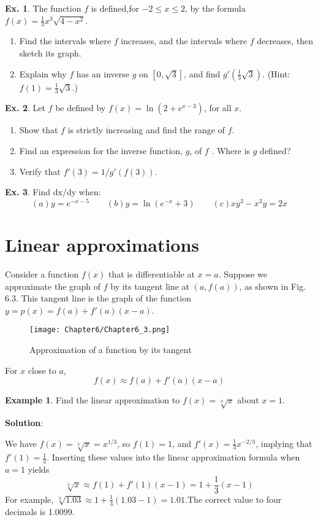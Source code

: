 \documentclass[10pt,a4paper]{book}
\theoremstyle{definition}\newtheorem{definition}{Definition}
\theoremstyle{definition}\newtheorem{fact}{Fact}
\theoremstyle{definition}\newtheorem{ex}{Ex.}
\theoremstyle{definition}\newtheorem{project}{Project}
\theoremstyle{definition}\newtheorem{problem}{Problem}
\theoremstyle{definition}\newtheorem{example}{Example}
\numberwithin{theorem}{chapter}
\numberwithin{corollary}{chapter}
\numberwithin{assumption}{chapter}
\numberwithin{definition}{chapter}
\numberwithin{prop}{chapter}
\numberwithin{notation}{chapter}
\numberwithin{problem}{chapter}
\numberwithin{example}{chapter}
\numberwithin{fact}{chapter}
\numberwithin{ex}{chapter}
\begin{document}
	\begin{ex}
		The function $f$ is defined,for $-2 \leq x \leq 2$, by the formula $f(x)= \frac{1}{3}x^3\sqrt{4-x^2}$.
		\begin{enumerate}[label=(\alph*)]
			\item Find the intervals where $f$ increases, and the intervals where $f$ decreases, then sketch its graph.
			\item Explain why $f$ has an inverse $g$ on $[0, \sqrt{3}]$, and find $g'(\frac{1}{3}\sqrt{3})$. (Hint: $f(1) = \frac{1}{3}\sqrt{3}$.)
		\end{enumerate}
	\end{ex}
	
	\begin{ex}
		Let $f$ be defined by $f(x) = \ln(2 + e^{x-3})$, for all $x$.
		\begin{enumerate}[label=(\alph*)]
			\item Show that $f$ is strictly increasing and find the range of $f$.
			\item Find an expression for the inverse function, $g$, of $f$ . Where is $g$ defined?
			\item Verify that $f'(3)=1/g'(f(3))$.
		\end{enumerate}
	\end{ex}
	
	\begin{ex}
		Find dx/dy when:
		\begin{equation*}
			(a) y=e^{-x-5} \qquad
			(b) y=\ln(e^{-x}+3) \qquad
			(c) xy^3-x^3y=2x
		\end{equation*}
	\end{ex}
	
	\section{Linear approximations}
	
	Consider a function $f(x)$ that is differentiable at $x = a$. Suppose we approximate the graph of $f$ by its tangent line at $(a, f(a))$, as shown in Fig. 6.3. This tangent line is the graph of the function $y = p(x) = f (a) + f'(a)(x - a)$.
	\begin{figure}[H]
		\centering
		\texttt{[image: Chapter6/Chapter6\_3.png]}
		\caption{Approximation of a function by its tangent}
	\end{figure}
	For $x$ close to $a$,
	$$f(x) \approx f(a) + f'(a)(x-a)$$
	
	\begin{example}
		Find the linear approximation to $f(x) = \sqrt[3]{x}$ about $x = 1$.
		
		\textbf{Solution}:
		
		We have $f(x) = \sqrt[3]{x} = x^{1/3}$, so $f(1) = 1$, and $f'(x) = \frac{1}{3}x^{-2/3}$, implying that $f'(1) = \frac{1}{3}$. Inserting these values into the linear approximation formula when $a=1$ yields
		$$\sqrt[3]{x} \approx f(1) + f'(1)(x-1) = 1+\frac{1}{3}(x-1)$$
		For example, $\sqrt[3]{1.03} \approx 1+\frac{1}{3}(1.03-1) = 1.01$.The correct value to four decimals is 1.0099.
	\end{example}
	
\end{document}
